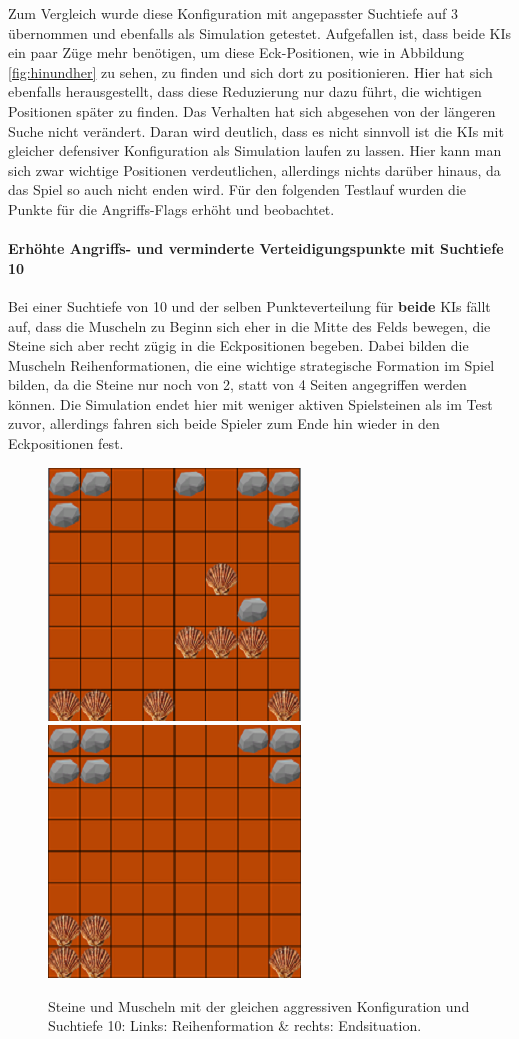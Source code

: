 Zum Vergleich wurde diese Konfiguration mit angepasster Suchtiefe auf 3 übernommen und ebenfalls als Simulation getestet. Aufgefallen ist, dass beide KIs ein paar Züge mehr benötigen, um diese Eck-Positionen, wie in Abbildung \ref{fig:hinundher} zu sehen, zu finden und sich dort zu positionieren. Hier hat sich ebenfalls herausgestellt, dass diese Reduzierung nur dazu führt, die wichtigen Positionen später zu finden. Das Verhalten hat sich abgesehen von der längeren Suche nicht verändert.
Daran wird deutlich, dass es nicht sinnvoll ist die KIs mit gleicher defensiver Konfiguration als Simulation laufen zu lassen. Hier kann man sich zwar wichtige Positionen verdeutlichen, allerdings nichts darüber hinaus, da das Spiel so auch nicht enden wird. Für den folgenden Testlauf wurden die Punkte für die Angriffs-Flags erhöht und beobachtet.
\paragraph{Erhöhte Angriffs- und verminderte Verteidigungspunkte mit Suchtiefe 10}
Bei einer Suchtiefe von 10 und der selben Punkteverteilung für \textbf{beide} KIs  fällt auf, dass die Muscheln zu Beginn sich eher in die Mitte des Felds bewegen, die Steine sich aber recht zügig in die Eckpositionen begeben. Dabei bilden die Muscheln Reihenformationen, die eine wichtige strategische Formation im Spiel bilden, da die Steine nur noch von 2, statt von 4 Seiten angegriffen werden können. Die Simulation endet hier mit weniger aktiven Spielsteinen als im Test zuvor, allerdings fahren sich beide Spieler zum Ende hin wieder in den Eckpositionen fest.
\begin{figure}[h]
	\centering
	\includegraphics{img/reihe22}
	\includegraphics{img/Aggro/aggroEnde22}
	\caption{Steine und Muscheln mit der gleichen aggressiven Konfiguration und Suchtiefe 10: Links: Reihenformation \& rechts: Endsituation.}
	\label{fig:aggro}
\end{figure}
